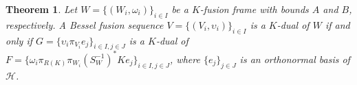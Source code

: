 \documentclass{birkjour}
\newtheorem{thm}{Theorem}[section]
\theoremstyle{definition}
\theoremstyle{remark}
\numberwithin{equation}{section}
\begin{document}
\begin{thm}\label{local2}
Let $W = \lbrace (W_{i}, \omega_{i})\rbrace_{i\in I}$ be a $K$-fusion frame
with  bounds $A$ and $B$, respectively. A Bessel fusion sequence
$V=\lbrace(V_{i},\upsilon_{i})\rbrace_{i\in I}$ is a $K$-dual of $W$ if and
only if $G=\lbrace \upsilon_{i}\pi_{V_{i}}e_{j}\rbrace_{i\in I, j\in J}$ is
a $K$-dual of $F=\lbrace \omega_{i}
\pi_{R(K)}\pi_{W_{i}}(S_{W}^{-1})^{*}Ke_{j}\rbrace_{i\in I, j\in J}$,
where $\lbrace e_{j}\rbrace_{j\in J}$ is an orthonormal basis of
$\mathcal{H}$.
\end{thm}
\end{document}
